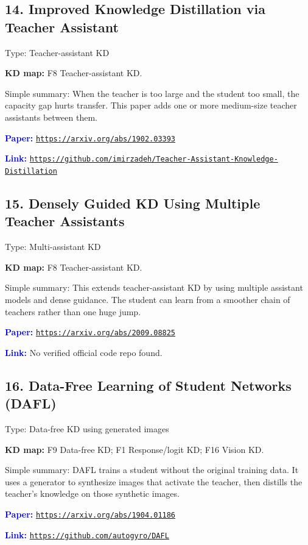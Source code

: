 \documentclass[10pt]{article}
\begin{document}
\subsection*{14. Improved Knowledge Distillation via Teacher Assistant}
Type: Teacher-assistant KD\par
\textbf{KD map:} F8 Teacher-assistant KD.\par
Simple summary: When the teacher is too large and the student too small, the capacity gap hurts transfer. This paper adds one or more medium-size teacher assistants between them.\par
\textcolor{blue}{\textbf{Paper:}} \href{https://arxiv.org/abs/1902.03393}{\nolinkurl{https://arxiv.org/abs/1902.03393}}\par
\textcolor{blue}{\textbf{Link:}} \href{https://github.com/imirzadeh/Teacher-Assistant-Knowledge-Distillation}{\nolinkurl{https://github.com/imirzadeh/Teacher-Assistant-Knowledge-Distillation}}\par

\subsection*{15. Densely Guided KD Using Multiple Teacher Assistants}
Type: Multi-assistant KD\par
\textbf{KD map:} F8 Teacher-assistant KD.\par
Simple summary: This extends teacher-assistant KD by using multiple assistant models and dense guidance. The student can learn from a smoother chain of teachers rather than one huge jump.\par
\textcolor{blue}{\textbf{Paper:}} \href{https://arxiv.org/abs/2009.08825}{\nolinkurl{https://arxiv.org/abs/2009.08825}}\par
\textcolor{blue}{\textbf{Link:}} No verified official code repo found.\par

\subsection*{16. Data-Free Learning of Student Networks (DAFL)}
Type: Data-free KD using generated images\par
\textbf{KD map:} F9 Data-free KD; F1 Response/logit KD; F16 Vision KD.\par
Simple summary: DAFL trains a student without the original training data. It uses a generator to synthesize images that activate the teacher, then distills the teacher's knowledge on those synthetic images.\par
\textcolor{blue}{\textbf{Paper:}} \href{https://arxiv.org/abs/1904.01186}{\nolinkurl{https://arxiv.org/abs/1904.01186}}\par
\textcolor{blue}{\textbf{Link:}} \href{https://github.com/autogyro/DAFL}{\nolinkurl{https://github.com/autogyro/DAFL}}\par
\end{document}
